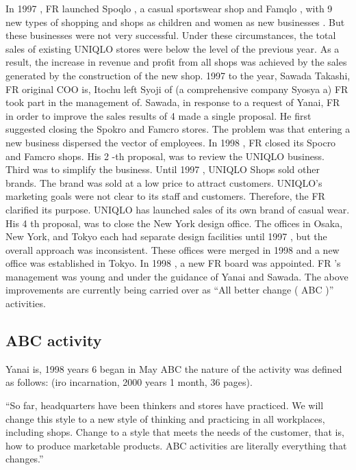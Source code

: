 \documentclass[]{article}
\begin{document}
In 1997 , FR launched Spoqlo , a casual sportswear shop and Famqlo ,
with 9 new types of shopping and shops as children and women as new
businesses . But these businesses were not very successful. Under these
circumstances, the total sales of existing UNIQLO stores were below the
level of the previous year. As a result, the increase in revenue and
profit from all shops was achieved by the sales generated by the
construction of the new shop. 1997 to the year, Sawada Takashi, FR
original COO is, Itochu left Syoji of (a comprehensive company Syosya a)
FR took part in the management of. Sawada, in response to a request of
Yanai, FR in order to improve the sales results of 4 made a single
proposal. He first suggested closing the Spokro and Famcro stores. The
problem was that entering a new business dispersed the vector of
employees. In 1998 , FR closed its Spocro and Famcro shops. His 2 -th
proposal, was to review the UNIQLO business. Third was to simplify the
business. Until 1997 , UNIQLO Shops sold other brands. The brand was
sold at a low price to attract customers. UNIQLO's marketing goals were
not clear to its staff and customers. Therefore, the FR clarified its
purpose. UNIQLO has launched sales of its own brand of casual wear. His
4 th proposal, was to close the New York design office. The offices in
Osaka, New York, and Tokyo each had separate design facilities until
1997 , but the overall approach was inconsistent. These offices were
merged in 1998 and a new office was established in Tokyo. In 1998 , a
new FR board was appointed. FR 's management was young and under the
guidance of Yanai and Sawada. The above improvements are currently being
carried over as ``All better change ( ABC )'' activities.

\hypertarget{abc-activity}{%
\subsection{ABC activity}\label{abc-activity}}

Yanai is, 1998 years 6 began in May ABC the nature of the activity was
defined as follows: (iro incarnation, 2000 years 1 month, 36 pages).

``So far, headquarters have been thinkers and stores have practiced. We
will change this style to a new style of thinking and practicing in all
workplaces, including shops. Change to a style that meets the needs of
the customer, that is, how to produce marketable products. ABC
activities are literally everything that changes.''
\end{document}
